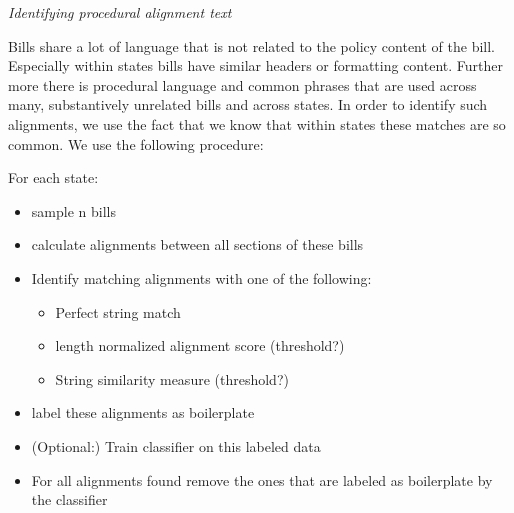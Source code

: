 \documentclass[12pt]{article} %
\begin{document}
\textit{Identifying procedural alignment text}

Bills share a lot of language that is not related to the policy content of the bill. Especially within states bills have similar headers or formatting content. Further more there is procedural language and common phrases that are used across many, substantively unrelated bills and across states. In order to identify such alignments, we use the fact that we know that within states these matches are so common. We use the following procedure:


For each state:\\
\begin{itemize}
    \item sample n bills
    \item calculate alignments between all sections of these bills
    \item Identify matching alignments with one of the following:
        \begin{itemize}
            \item Perfect string match
            \item length normalized alignment score (threshold?)
            \item String similarity measure (threshold?)
        \end{itemize}
    \item label these alignments as boilerplate
    \item (Optional:) Train classifier on this labeled data
    \item For all alignments found remove the ones that are labeled as boilerplate by the classifier
\end{itemize}
\end{document}
